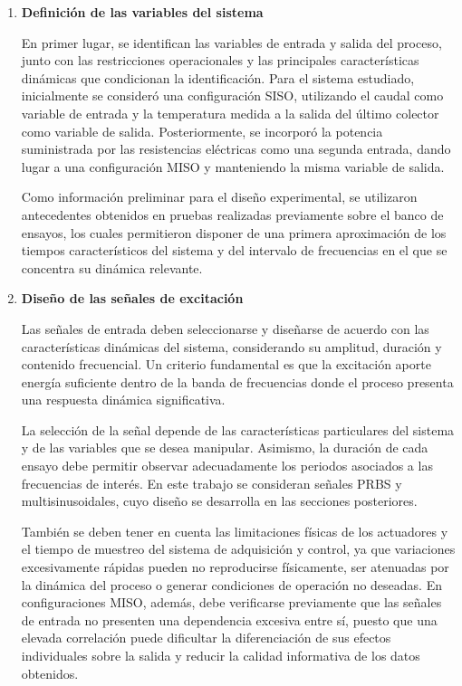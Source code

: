 \documentclass[11pt]{report}
\begin{document}
\begin{enumerate}
    \item \textbf{Definición de las variables del sistema}
    
    En primer lugar, se identifican las variables de entrada y salida del proceso, junto con las restricciones operacionales y las principales características dinámicas que condicionan la identificación. Para el sistema estudiado, inicialmente se consideró una configuración SISO, utilizando el caudal como variable de entrada y la temperatura medida a la salida del último colector como variable de salida. Posteriormente, se incorporó la potencia suministrada por las resistencias eléctricas como una segunda entrada, dando lugar a una configuración MISO y manteniendo la misma variable de salida.

    Como información preliminar para el diseño experimental, se utilizaron antecedentes obtenidos en pruebas realizadas previamente sobre el banco de ensayos, los cuales permitieron disponer de una primera aproximación de los tiempos característicos del sistema y del intervalo de frecuencias en el que se concentra su dinámica relevante.
    
    \item \textbf{Diseño de las señales de excitación}

    Las señales de entrada deben seleccionarse y diseñarse de acuerdo con las características dinámicas del sistema, considerando su amplitud, duración y contenido frecuencial. Un criterio fundamental es que la excitación aporte energía suficiente dentro de la banda de frecuencias donde el proceso presenta una respuesta dinámica significativa.

La selección de la señal depende de las características particulares del sistema y de las variables que se desea manipular. Asimismo, la duración de cada ensayo debe permitir observar adecuadamente los periodos asociados a las frecuencias de interés. En este trabajo se consideran señales PRBS y multisinusoidales, cuyo diseño se desarrolla en las secciones posteriores.

También se deben tener en cuenta las limitaciones físicas de los actuadores y el tiempo de muestreo del sistema de adquisición y control, ya que variaciones excesivamente rápidas pueden no reproducirse físicamente, ser atenuadas por la dinámica del proceso o generar condiciones de operación no deseadas. En configuraciones MISO, además, debe verificarse previamente que las señales de entrada no presenten una dependencia excesiva entre sí, puesto que una elevada correlación puede dificultar la diferenciación de sus efectos individuales sobre la salida y reducir la calidad informativa de los datos obtenidos.



\end{enumerate}
\end{document}
